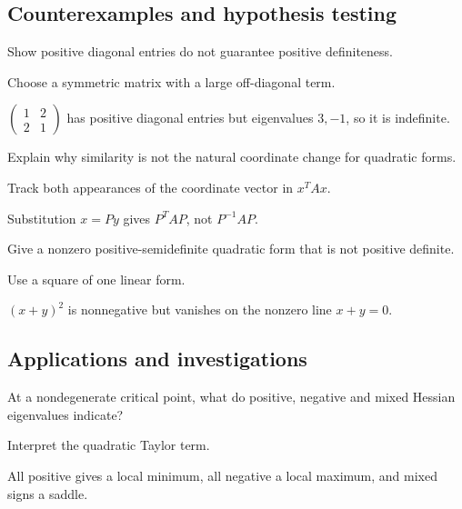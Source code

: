 \subsection*{Counterexamples and hypothesis testing}

\begin{exercise}\label{exr:i17-expand-10}
Show positive diagonal entries do not guarantee positive definiteness.
\end{exercise}
\begin{hint}
Choose a symmetric matrix with a large off-diagonal term.
\end{hint}
\begin{solution}
\(\begin{pmatrix}1&2\\2&1\end{pmatrix}\) has positive diagonal entries but eigenvalues \(3,-1\), so it is indefinite.
\end{solution}

\begin{exercise}\label{exr:i17-expand-11}
Explain why similarity is not the natural coordinate change for quadratic forms.
\end{exercise}
\begin{hint}
Track both appearances of the coordinate vector in \(x^TAx\).
\end{hint}
\begin{solution}
Substitution \(x=Py\) gives \(P^TAP\), not \(P^{-1}AP\).
\end{solution}

\begin{exercise}\label{exr:i17-expand-12}
Give a nonzero positive-semidefinite quadratic form that is not positive definite.
\end{exercise}
\begin{hint}
Use a square of one linear form.
\end{hint}
\begin{solution}
\((x+y)^2\) is nonnegative but vanishes on the nonzero line \(x+y=0\).
\end{solution}

\subsection*{Applications and investigations}

\begin{exercise}\label{exr:i17-expand-13}
At a nondegenerate critical point, what do positive, negative and mixed Hessian eigenvalues indicate?
\end{exercise}
\begin{hint}
Interpret the quadratic Taylor term.
\end{hint}
\begin{solution}
All positive gives a local minimum, all negative a local maximum, and mixed signs a saddle.
\end{solution}

